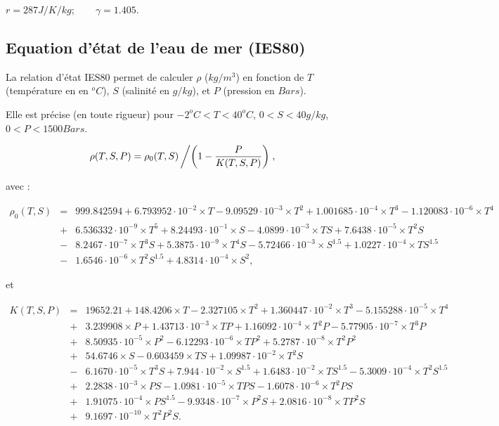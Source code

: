 $ r = 287 J/K/kg ; \qquad \gamma = 1.405$.


\subsection{Equation d'état de l'eau de mer (IES80)}

La relation d'état IES80 permet  de calculer $\rho$ ($kg /m^3$) en fonction
de $T$ (température en  en $^o C$), $S$ (salinité en $g/kg$), et $P$ (pression en $Bars$). 

Elle est précise (en toute rigueur) pour $-2^oC<T < 40^o C$, $0<S<40g/kg$, 
$0<P<1500 Bars$.

\vspace{.5cm}

{
\tiny

$$
\rho(T,S,P) = \rho_0(T,S) \left/ \left( 1 - \frac{P}{K(T,S,P)} \right) \right.,
$$

avec :

\begin{eqnarray*}
\rho_0(T,S) &=& 999.842594+6.793952\cdot 10^{-2} \times T-9.09529\cdot 10^{-3} \times T^2+1.001685\cdot 10^{-4} \times T^3 -1.120083\cdot 10^{-6} \times T^4 \\
            &+& 6.536332\cdot 10^{-9} \times T^5+8.24493\cdot 10^{-1} \times S-4.0899\cdot 10^{-3} \times T S+7.6438\cdot 10^{-5} \times T^2 S \\
	    &-&8.2467\cdot 10^{-7} \times T^3 S + 5.3875\cdot 10^{-9} \times T^4 S-5.72466\cdot 10^{-3} \times S^{1.5}+1.0227\cdot 10^{-4} \times T S^{1.5}\\
	    &-&1.6546\cdot 10^{-6} \times T^2 S^{1.5}+4.8314\cdot 10^{-4} \times S^2, 
\end{eqnarray*}

et 

\begin{eqnarray*}
K(T,S,P) &=& 19652.21+148.4206 \times T-2.327105 \times T^2+1.360447\cdot 10^{-2} \times T^3-5.155288\cdot 10^{-5} \times T^4 \\
         &+&3.239908 \times P+1.43713\cdot 10^{-3} \times T P+1.16092\cdot 10^{-4} \times T^2 P-5.77905\cdot 10^{-7} \times T^3 P \\
         &+&8.50935\cdot 10^{-5} \times P^2-6.12293\cdot 10^{-6} \times T P^2+5.2787\cdot 10^{-8} \times T^2 P^2 \\
         &+&54.6746 \times S-0.603459 \times T S+1.09987\cdot 10^{-2} \times T^2 S \\
         &-&6.1670\cdot 10^{-5} \times T^3 S+7.944\cdot 10^{-2} \times S^{1.5}+1.6483\cdot 10^{-2} \times T S^{1.5}-5.3009\cdot 10^{-4} \times T^2 S^{1.5} \\
         &+&2.2838\cdot 10^{-3} \times P S-1.0981\cdot 10^{-5} \times T P S-1.6078\cdot 10^{-6} \times T^2 P S \\
	 &+&1.91075\cdot 10^{-4} \times P  S^{1.5}-9.9348\cdot 10^{-7} \times P^2 S+2.0816\cdot 10^{-8} \times T P^2 S \\
	 &+&9.1697\cdot 10^{-10} \times T^2 P^2 S.
\end{eqnarray*}

}


